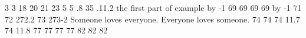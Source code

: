 \relax 
{} {{3}} 
 {{{}}{{3}}}
 {{18}} 
 {{20}} 
 {{21}} 
 {{23}} 
 {{5\relax }} 
 {{5\relax }} 
 {{.8}} 
 {{35}} 
 {{.11.2}} 
 {{the first part of example {\advance \excnt by -1 69}}} 
 {{69}}
 {{{}}{{69}}}
 {{{}}{{69}}}
 {{{\advance \excnt by -1 71}{\it {}}}} 
 {{72}} 
 {{{2}}{{72.2}}}
 {{73}} 
 {{{2}}{{73-2}}}
 {{Someone loves everyone.}} 
 {{Everyone loves someone.}} 
 {{74}} 
 {{{}}{{74}}}
 {{{}}{{74}}}
 {{11.7}} 
 {{{74}\relax }} 
 {{11.8}} 
 {{77}}
 {{{}}{{77}}}
 {{{}}{{77}}}
 {{{}}{{77}}}
 {{82}} 
 {{{}}{{82}}}
 {{{}}{{82}}}
